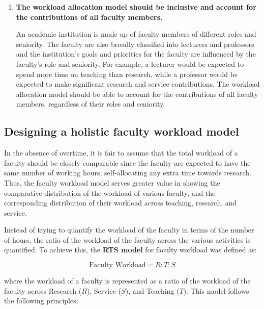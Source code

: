 \begin{enumerate}
  \item \textbf{The workload allocation model should be inclusive and account for the contributions of all faculty members.}

        An academic institution is made up of faculty members of different roles and seniority. The faculty are also broadly classified into lecturers and professors and the institution's goals and priorities for the faculty are influenced by the faculty's role and seniority. For example, a lecturer would be expected to spend more time on teaching than research, while a professor would be expected to make significant research and service contributions. The workload allocation model should be able to account for the contributions of all faculty members, regardless of their roles and seniority.

\end{enumerate}

\subsection{Designing a holistic faculty workload model}

In the absence of overtime, it is fair to assume that the total workload of a faculty should be closely comparable since the faculty are expected to have the same number of working hours, self-allocating any extra time towards research. Thus, the faculty workload model serves greater value in showing the comparative distribution of the workload of various faculty, and the corresponding distribution of their workload across teaching, research, and service.

Instead of trying to quantify the workload of the faculty in terms of the number of hours, the ratio of the workload of the faculty across the various activities is quantified. To achieve this, the \textbf{RTS model} for faculty workload was defined as:

\begin{equation*}
  \text{Faculty Workload} = R:T:S
\end{equation*}

where the workload of a faculty is represented as a ratio of the workload of the faculty across Research ($R$), Service ($S$), and Teaching ($T$). This model follows the following principles:

